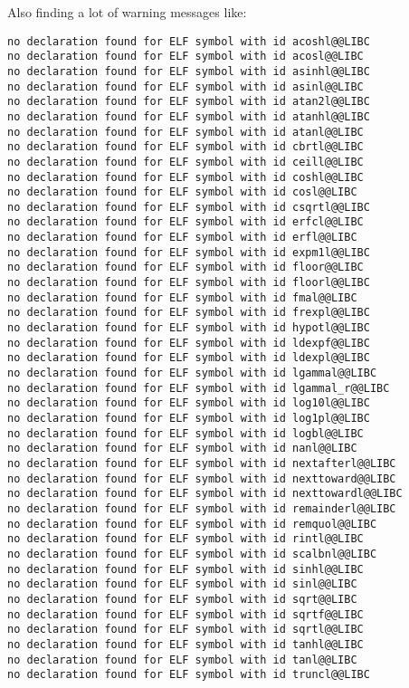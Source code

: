 Also finding a lot of warning messages like:
\begin{lstlisting}
no declaration found for ELF symbol with id acoshl@@LIBC
no declaration found for ELF symbol with id acosl@@LIBC
no declaration found for ELF symbol with id asinhl@@LIBC
no declaration found for ELF symbol with id asinl@@LIBC
no declaration found for ELF symbol with id atan2l@@LIBC
no declaration found for ELF symbol with id atanhl@@LIBC
no declaration found for ELF symbol with id atanl@@LIBC
no declaration found for ELF symbol with id cbrtl@@LIBC
no declaration found for ELF symbol with id ceill@@LIBC
no declaration found for ELF symbol with id coshl@@LIBC
no declaration found for ELF symbol with id cosl@@LIBC
no declaration found for ELF symbol with id csqrtl@@LIBC
no declaration found for ELF symbol with id erfcl@@LIBC
no declaration found for ELF symbol with id erfl@@LIBC
no declaration found for ELF symbol with id expm1l@@LIBC
no declaration found for ELF symbol with id floor@@LIBC
no declaration found for ELF symbol with id floorl@@LIBC
no declaration found for ELF symbol with id fmal@@LIBC
no declaration found for ELF symbol with id frexpl@@LIBC
no declaration found for ELF symbol with id hypotl@@LIBC
no declaration found for ELF symbol with id ldexpf@@LIBC
no declaration found for ELF symbol with id ldexpl@@LIBC
no declaration found for ELF symbol with id lgammal@@LIBC
no declaration found for ELF symbol with id lgammal_r@@LIBC
no declaration found for ELF symbol with id log10l@@LIBC
no declaration found for ELF symbol with id log1pl@@LIBC
no declaration found for ELF symbol with id logbl@@LIBC
no declaration found for ELF symbol with id nanl@@LIBC
no declaration found for ELF symbol with id nextafterl@@LIBC
no declaration found for ELF symbol with id nexttoward@@LIBC
no declaration found for ELF symbol with id nexttowardl@@LIBC
no declaration found for ELF symbol with id remainderl@@LIBC
no declaration found for ELF symbol with id remquol@@LIBC
no declaration found for ELF symbol with id rintl@@LIBC
no declaration found for ELF symbol with id scalbnl@@LIBC
no declaration found for ELF symbol with id sinhl@@LIBC
no declaration found for ELF symbol with id sinl@@LIBC
no declaration found for ELF symbol with id sqrt@@LIBC
no declaration found for ELF symbol with id sqrtf@@LIBC
no declaration found for ELF symbol with id sqrtl@@LIBC
no declaration found for ELF symbol with id tanhl@@LIBC
no declaration found for ELF symbol with id tanl@@LIBC
no declaration found for ELF symbol with id truncl@@LIBC    
\end{lstlisting}

